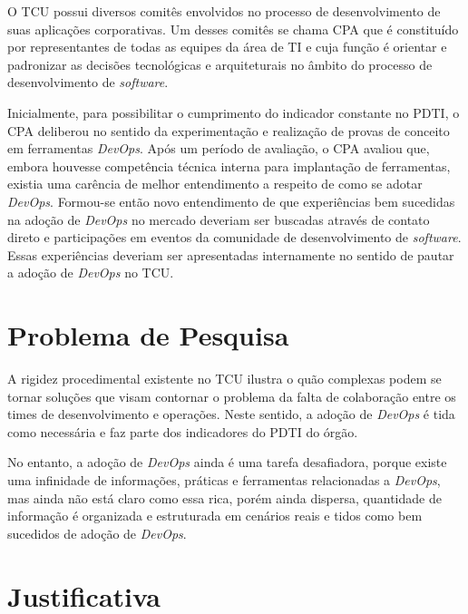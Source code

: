 O \acrshort{TCU} possui diversos comitês envolvidos no processo de desenvolvimento
de suas aplicações corporativas. Um desses comitês se chama \acrfull{CPA} que é
constituído por representantes de todas as equipes da área de \acrshort{TI} e cuja
função é orientar e padronizar as decisões tecnológicas e arquiteturais no
âmbito do processo de desenvolvimento de \textit{software}.

Inicialmente, para possibilitar o cumprimento do indicador constante no
\acrshort{PDTI}, o \acrshort{CPA} deliberou no sentido da experimentação e
realização de provas de conceito em ferramentas \textit{DevOps}. Após um
período de avaliação, o \acrshort{CPA} avaliou que, embora
houvesse competência técnica interna para implantação de ferramentas, existia
uma carência de melhor entendimento a respeito de como se adotar \textit{DevOps}.
Formou-se então novo entendimento de que experiências bem sucedidas na adoção de
\textit{DevOps} no mercado deveriam ser buscadas através de contato direto
e participações em eventos da comunidade de desenvolvimento de {\it software}.
Essas experiências deveriam ser apresentadas internamente no sentido de pautar
a adoção de \textit{DevOps} no \acrshort{TCU}.

\section{Problema de Pesquisa}%

A rigidez procedimental existente no \acrshort{TCU} ilustra o
quão complexas podem se tornar soluções que visam contornar o problema da falta
de colaboração entre os times de desenvolvimento e operações. Neste sentido, a
adoção de {\it DevOps} é tida como necessária e faz parte dos indicadores do
\acrshort{PDTI} do órgão.

No entanto, a adoção de {\it DevOps} ainda é uma tarefa desafiadora, porque existe
uma infinidade de informações, práticas e ferramentas relacionadas a {\it DevOps},
mas ainda não está claro como essa rica, porém ainda dispersa, quantidade de
informação é organizada e estruturada em cenários reais e tidos como bem
sucedidos de adoção de {\it DevOps}.

\section{Justificativa}%

